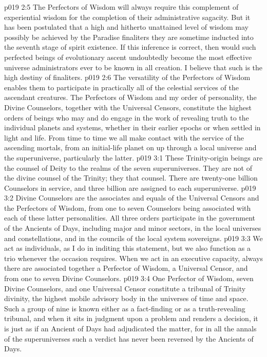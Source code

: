 \vs p019 2:5 The Perfectors of Wisdom will always require this complement of experiential wisdom for the completion of their administrative sagacity. But it has been postulated that a high and hitherto unattained level of wisdom may possibly be achieved by the Paradise finaliters  they are sometime inducted into the seventh stage of spirit existence. If this inference is correct, then would such perfected beings of evolutionary ascent undoubtedly become the most effective universe administrators ever to be known in all creation. I believe that such is the high destiny of finaliters.
\pc \vs p019 2:6 The versatility of the Perfectors of Wisdom enables them to participate in practically all of the celestial services of the ascendant creatures. The Perfectors of Wisdom and my order of personality, the Divine Counselors, together with the Universal Censors, constitute the highest orders of beings who may and do engage in the work of revealing truth to the individual planets and systems, whether in their earlier epochs or when settled in light and life. From time to time we all make contact with the service of the ascending mortals, from an initial\hyp{}life planet on up through a local universe and the superuniverse, particularly the latter.
\vs p019 3:1 These Trinity\hyp{}origin beings are the counsel of Deity to the realms of the seven superuniverses. They are not  of the divine counsel of the Trinity; they  that counsel. There are twenty\hyp{}one billion Counselors in service, and three billion are assigned to each superuniverse.
\vs p019 3:2 Divine Counselors are the associates and equals of the Universal Censors and the Perfectors of Wisdom, from one to seven Counselors being associated with each of these latter personalities. All three orders participate in the government of the Ancients of Days, including major and minor sectors, in the local universes and constellations, and in the councils of the local system sovereigns.
\vs p019 3:3 We act as individuals, as I do in inditing this statement, but we also function as a trio whenever the occasion requires. When we act in an executive capacity, always there are associated together a Perfector of Wisdom, a Universal Censor, and from one to seven Divine Counselors.
\pc \vs p019 3:4 One Perfector of Wisdom, seven Divine Counselors, and one Universal Censor constitute a tribunal of Trinity divinity, the highest mobile advisory body in the universes of time and space. Such a group of nine is known either as a fact\hyp{}finding or as a truth\hyp{}revealing tribunal, and when it sits in judgment upon a problem and renders a decision, it is just as if an Ancient of Days had adjudicated the matter, for in all the annals of the superuniverses such a verdict has never been reversed by the Ancients of Days.\plusone
